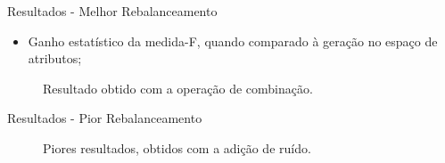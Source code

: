 \documentclass{beamer}
\begin{document}
\begin{frame}{Resultados - Melhor Rebalanceamento}
\setlength\leftmargini{0em}
\justifying
\begin{itemize}
\item Ganho estatístico da medida-F, quando comparado à geração no espaço de atributos; %
\end{itemize}
\vspace{-0.3cm}
\begin{figure}[htb]
 \begin{center}
 \end{center}
 \caption{Resultado obtido com a operação de combinação.}
\end{figure}
\end{frame}
\begin{frame}{Resultados - Pior Rebalanceamento}
\setlength\leftmargini{0em}
\justifying
\begin{figure}[htb]
 \begin{center}
 \end{center}
 \caption{Piores resultados, obtidos com a adição de ruído.}
\end{figure}
\end{frame}
%
%
\end{document}
